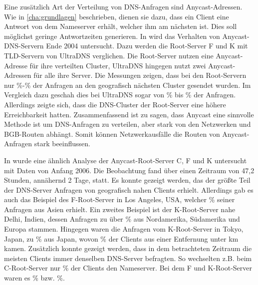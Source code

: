 \documentclass[a4paper, 12pt, BCOR10mm, DIV12, toc=bibliography, toc=listof, german]{scrbook}
\begin{document}
	Eine zusätzlich Art der Verteilung von DNS-Anfragen sind Anycast-Adressen. Wie in
	\ref{cha:grundlagen} beschrieben, dienen sie dazu, dass ein Client eine Antwort von dem Nameserver
	erhält, welcher ihm am nächsten ist. Dies soll möglichst geringe Antwortzeiten generieren. In \cite{sapate2005}
	wird das Verhalten von Anycast-DNS-Servern Ende 2004 untersucht. Dazu werden die
	Root-Server F und K mit TLD-Servern von UltraDNS verglichen. Die Root-Server nutzen eine
	Anycast-Adresse für ihre verteilten Cluster, UltraDNS hingegen nutzt zwei Anycast-Adressen für
	alle ihre Server. Die Messungen zeigen, dass bei den Root-Servern nur \unit[15]{\%}-\unit[27]{\%}
	der Anfragen an den	geografisch nächsten Cluster gesendet wurden. Im Vergleich dazu geschah dies bei
	UltraDNS sogar von \unit[45]{\%} bis \unit[53]{\%} der Anfragen. Allerdings zeigte sich, dass die
	DNS-Cluster der Root-Server eine höhere Erreichbarkeit hatten. Zusammenfassend
	ist zu sagen, dass Anycast eine sinnvolle Methode ist um DNS-Anfragen zu verteilen, aber stark von
	den Netzwerken und BGB-Routen abhängt. Somit können Netzwerkausfälle die Routen von Anycast-Anfragen stark
	beeinflussen.

	In \cite{lietal2007} wurde eine ähnlich Analyse der Anycast-Root-Server C, F und K untersucht mit Daten
	von Anfang 2006. Die Beobachtung fand über einen Zeitraum von 47,2 Stunden, annähernd 2 Tage,
	statt. Es konnte gezeigt werden, das der größte Teil der DNS-Server Anfragen von geografisch nahen
	Clients erhielt.  Allerdings gab es auch das Beispiel des F-Root-Server in Los Angeles, USA,
	welcher \unit[88]{\%} seiner Anfragen aus Asien erhielt. Ein zweites Beispiel ist der K-Root-Server
	nahe Delhi, Indien, dessen Anfragen zu über \unit[75]{\%} aus Nordamerika, Südamerika und Europa
	stammen. Hingegen waren die Anfragen vom K-Root-Server in Tokyo, Japan, zu \unit[99,7]{\%} aus
	Japan, wovon \unit[75]{\%} der Clients aus einer Entfernung unter \unit[1000]{km} kamen. Zusätzlich
	konnte gezeigt werden, dass in dem betrachteten Zeitraum die meisten Clients immer denselben
	DNS-Server befragten. So wechselten z.B. beim C-Root-Server nur \unit[1,7]{\%} der
	Clients den Nameserver. Bei dem F und K-Root-Server waren es \unit[1,4]{\%} bzw.
	\unit[4,7]{\%}.
\end{document}

